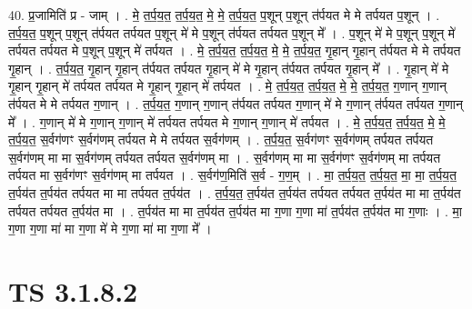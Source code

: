 \documentclass[17pt]{extarticle}
\begin{document}
40. प्र॒जामिति॑ प्र - जाम् । . मे॒ त॒र्प॒य॒त॒ त॒र्प॒य॒त॒ मे॒ मे॒ त॒र्प॒य॒त॒ प॒शून् प॒शून् त॑र्पयत मे मे तर्पयत प॒शून् । . त॒र्प॒य॒त॒ प॒शून् प॒शून् त॑र्पयत तर्पयत प॒शून् मे॑ मे प॒शून् त॑र्पयत तर्पयत प॒शून् मे᳚ । . प॒शून् मे॑ मे प॒शून् प॒शून् मे॑ तर्पयत तर्पयत मे प॒शून् प॒शून् मे॑ तर्पयत । . मे॒ त॒र्प॒य॒त॒ त॒र्प॒य॒त॒ मे॒ मे॒ त॒र्प॒य॒त॒ गृ॒हान् गृ॒हान् त॑र्पयत मे मे तर्पयत गृ॒हान् । . त॒र्प॒य॒त॒ गृ॒हान् गृ॒हान् त॑र्पयत तर्पयत गृ॒हान् मे॑ मे गृ॒हान् त॑र्पयत तर्पयत गृ॒हान् मे᳚ । . गृ॒हान् मे॑ मे गृ॒हान् गृ॒हान् मे॑ तर्पयत तर्पयत मे गृ॒हान् गृ॒हान् मे॑ तर्पयत । . मे॒ त॒र्प॒य॒त॒ त॒र्प॒य॒त॒ मे॒ मे॒ त॒र्प॒य॒त॒ ग॒णान् ग॒णान् त॑र्पयत मे मे तर्पयत ग॒णान् । . त॒र्प॒य॒त॒ ग॒णान् ग॒णान् त॑र्पयत तर्पयत ग॒णान् मे॑ मे ग॒णान् त॑र्पयत तर्पयत ग॒णान् मे᳚ । . ग॒णान् मे॑ मे ग॒णान् ग॒णान् मे॑ तर्पयत तर्पयत मे ग॒णान् ग॒णान् मे॑ तर्पयत । . मे॒ त॒र्प॒य॒त॒ त॒र्प॒य॒त॒ मे॒ मे॒ त॒र्प॒य॒त॒ स॒र्वग॑णꣳ स॒र्वग॑णम् तर्पयत मे मे तर्पयत स॒र्वग॑णम् । . त॒र्प॒य॒त॒ स॒र्वग॑णꣳ स॒र्वग॑णम् तर्पयत तर्पयत स॒र्वग॑णम् मा मा स॒र्वग॑णम् तर्पयत तर्पयत स॒र्वग॑णम् मा । . स॒र्वग॑णम् मा मा स॒र्वग॑णꣳ स॒र्वग॑णम् मा तर्पयत तर्पयत मा स॒र्वग॑णꣳ स॒र्वग॑णम् मा तर्पयत । . स॒र्वग॑ण॒मिति॑ स॒र्व - ग॒ण॒म् । . मा॒ त॒र्प॒य॒त॒ त॒र्प॒य॒त॒ मा॒ मा॒ त॒र्प॒य॒त॒ त॒र्पय॑त त॒र्पय॑त तर्पयत मा मा तर्पयत त॒र्पय॑त । . त॒र्प॒य॒त॒ त॒र्पय॑त त॒र्पय॑त तर्पयत तर्पयत त॒र्पय॑त मा मा त॒र्पय॑त तर्पयत तर्पयत त॒र्पय॑त मा । . त॒र्पय॑त मा मा त॒र्पय॑त त॒र्पय॑त मा ग॒णा ग॒णा मा॑ त॒र्पय॑त त॒र्पय॑त मा ग॒णाः । . मा॒ ग॒णा ग॒णा मा॑ मा ग॒णा मे॑ मे ग॒णा मा॑ मा ग॒णा मे᳚ । \newline
\pagebreak
{}

\section{ TS 3.1.8.2 }
\end{document}
